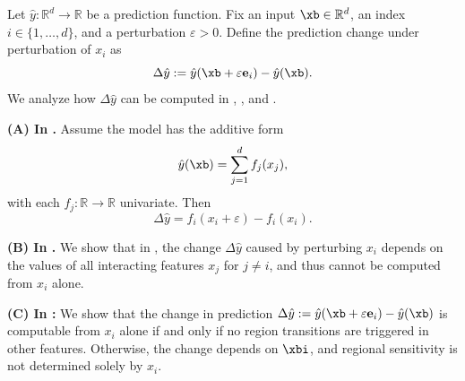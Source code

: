 \begin{proposition}
Let \( \hat{y} : \mathbb{R}^d \to \mathbb{R} \) be a prediction function. Fix an input \( \xb \in \mathbb{R}^d \), an index \( i \in \{1, \dots, d\} \), and a perturbation \( \varepsilon > 0 \). Define the prediction change under perturbation of \( x_i \) as
\[
\Delta \hat{y} := \hat{y}(\xb + \varepsilon \mathbf{e}_i) - \hat{y}(\xb).
\]
We analyze how \( \Delta \hat{y} \) can be computed in \gam, \gamm, and \method{}.

\textbf{(A) In \gam.}
Assume the model has the additive form
\[
\hat{y}(\xb) = \sum_{j=1}^d f_j(x_j),
\]
with each \( f_j : \mathbb{R} \to \mathbb{R} \) univariate. Then
\[
\Delta \hat{y} = f_i(x_i + \varepsilon) - f_i(x_i).
\]

\textbf{(B) In \gamm.}
We show that in \gamm, the change \( \Delta \hat{y} \) caused by perturbing \( x_i \) depends on the values of all interacting features \( x_j \) for \( j \ne i \), and thus cannot be computed from \( x_i \) alone.

\textbf{(C) In \method{}:} We show that the change in prediction \( \Delta \hat{y} := \hat{y}(\xb + \varepsilon \mathbf{e}_i) - \hat{y}(\xb) \) is computable from \( x_i \) alone if and only if no region transitions are triggered in other features. Otherwise, the change depends on \( \xbi \), and regional sensitivity is not determined solely by \( x_i \).

\end{proposition}

